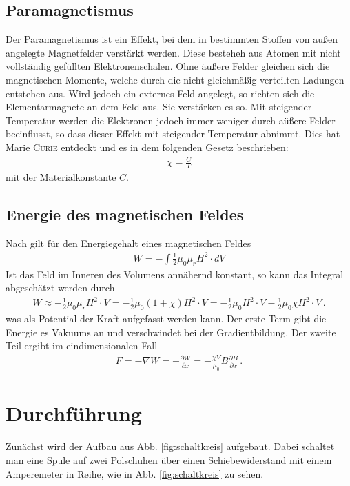 \documentclass[12pt,a4paper,titlepage,headinclude,bibtotoc]{scrartcl}
\begin{document}
\subsection{Paramagnetismus}
Der Paramagnetismus ist ein Effekt, bei dem in bestimmten Stoffen von außen angelegte Magnetfelder verstärkt werden.
Diese besteheh aus Atomen mit nicht vollständig gefüllten Elektronenschalen.
Ohne äußere Felder gleichen sich die magnetischen Momente, welche durch die nicht gleichmäßig verteilten Ladungen entstehen aus.
Wird jedoch ein externes Feld angelegt, so richten sich die Elementarmagnete an dem Feld aus.
Sie verstärken es so.
Mit steigender Temperatur werden die Elektronen jedoch immer weniger durch aüßere Felder beeinflusst, so dass dieser Effekt mit steigender Temperatur abnimmt.
Dies hat Marie \textsc{Curie} entdeckt und es in dem folgenden Gesetz beschrieben:
\begin{align*}
\chi=\frac{C}{T}
\end{align*}
mit der Materialkonstante $C$.

\subsection{Energie des magnetischen Feldes}
Nach \cite[S. 134]{demtroeder2} gilt für den Energiegehalt eines magnetischen Feldes
\begin{align*}
	W=-\int\frac{1}{2}\mu_0\mu_rH^2\cdot dV
\end{align*}
Ist das Feld im Inneren des Volumens annähernd konstant, so kann das Integral abgeschätzt werden durch
\begin{align}
	W\approx-\frac{1}{2}\mu_0\mu_rH^2\cdot V=-\frac{1}{2}\mu_0(1+\chi)H^2\cdot V=-\frac{1}{2}\mu_0H^2\cdot V-\frac{1}{2}\mu_0\chi H^2\cdot V\, .
\end{align}
was als Potential der Kraft aufgefasst werden kann.
Der erste Term gibt die Energie es Vakuums an und verschwindet bei der Gradientbildung.
Der zweite Teil ergibt im eindimensionalen Fall
\begin{align}
	F=-\nabla W=-\frac{\partial W}{\partial x}=-\frac{\chi V}{\mu_0}B\frac{\partial B}{\partial x}\, .\label{eq:GradW}
\end{align}

\section{Durchführung}
\label{sec:durchfuehrung}
Zunächst wird der Aufbau aus Abb. \ref{fig:schaltkreis} aufgebaut.
Dabei schaltet man eine Spule auf zwei Polschuhen über einen Schiebewiderstand mit einem Amperemeter in Reihe, wie in Abb. \ref{fig:schaltkreis} zu sehen.
\end{document}
